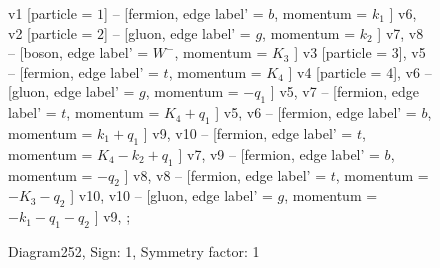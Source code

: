 \documentclass{revtex4}
\begin{document}
\begin{figure}[!htb]
\begin{center}
{    %
v1 [particle = \(1\)] -- [fermion, edge label' = \(b\), momentum = \(k_{1}\) ] v6, 
v2 [particle = \(2\)] -- [gluon, edge label' = \(g\), momentum = \(k_{2}\) ] v7, 
v8 -- [boson, edge label' = \(W^{-}\), momentum = \(K_{3}\) ] v3 [particle = \(3\)], 
v5 -- [fermion, edge label' = \(t\), momentum = \(K_{4}\) ] v4 [particle = \(4\)], 
v6 -- [gluon, edge label' = \(g\), momentum = \(-q_{1}\) ] v5, 
v7 -- [fermion, edge label' = \(t\), momentum = \(K_{4} + q_{1}\) ] v5, 
v6 -- [fermion, edge label' = \(b\), momentum = \(k_{1} + q_{1}\) ] v9, 
v10 -- [fermion, edge label' = \(t\), momentum = \(K_{4} - k_{2} + q_{1}\) ] v7, 
v9 -- [fermion, edge label' = \(b\), momentum = \(-q_{2}\) ] v8, 
v8 -- [fermion, edge label' = \(t\), momentum = \(-K_{3} - q_{2}\) ] v10, 
v10 -- [gluon, edge label' = \(g\), momentum = \(-k_{1} - q_{1} - q_{2}\) ] v9, 
};
\end{center}
\caption{Diagram252, Sign: 1, Symmetry factor: 1}
\end{figure}
\newpage
\end{document}
